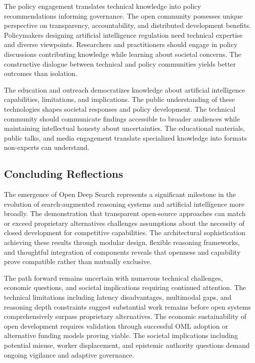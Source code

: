 The policy engagement translates technical knowledge into policy recommendations informing governance. The open community possesses unique perspective on transparency, accountability, and distributed development benefits. Policymakers designing artificial intelligence regulation need technical expertise and diverse viewpoints. Researchers and practitioners should engage in policy discussions contributing knowledge while learning about societal concerns. The constructive dialogue between technical and policy communities yields better outcomes than isolation.

The education and outreach democratizes knowledge about artificial intelligence capabilities, limitations, and implications. The public understanding of these technologies shapes societal responses and policy development. The technical community should communicate findings accessible to broader audiences while maintaining intellectual honesty about uncertainties. The educational materials, public talks, and media engagement translate specialized knowledge into formats non-experts can understand.

\subsection{Concluding Reflections}

The emergence of Open Deep Search represents a significant milestone in the evolution of search-augmented reasoning systems and artificial intelligence more broadly. The demonstration that transparent open-source approaches can match or exceed proprietary alternatives challenges assumptions about the necessity of closed development for competitive capabilities. The architectural sophistication achieving these results through modular design, flexible reasoning frameworks, and thoughtful integration of components reveals that openness and capability prove compatible rather than mutually exclusive.

The path forward remains uncertain with numerous technical challenges, economic questions, and societal implications requiring continued attention. The technical limitations including latency disadvantages, multimodal gaps, and reasoning depth constraints suggest substantial work remains before open systems comprehensively surpass proprietary alternatives. The economic sustainability of open development requires validation through successful OML adoption or alternative funding models proving viable. The societal implications including potential misuse, worker displacement, and epistemic authority questions demand ongoing vigilance and adaptive governance.

